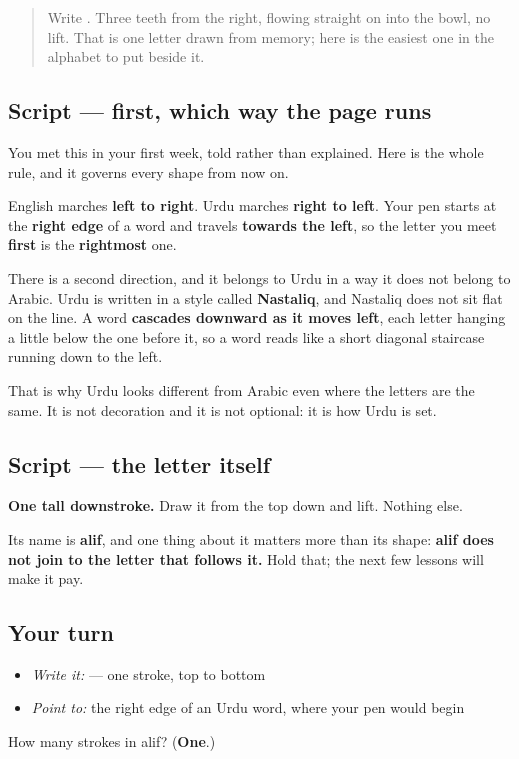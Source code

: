 \label{lesson:UR-W02-alef}



\begin{quote}
Write \textbf{}. Three teeth from the right, flowing straight on into the bowl, no lift. That is one letter drawn from memory; here is the easiest one in the alphabet to put beside it.
\end{quote}

\subsection*{Script — first, which way the page runs}

You met this in your first week, told rather than explained. Here is the whole rule, and it governs every shape from now on.

English marches \textbf{left to right}. Urdu marches \textbf{right to left}. Your pen starts at the \textbf{right edge} of a word and travels \textbf{towards the left}, so the letter you meet \textbf{first} is the \textbf{rightmost} one.

There is a second direction, and it belongs to Urdu in a way it does not belong to Arabic. Urdu is written in a style called \textbf{Nastaliq}, and Nastaliq does not sit flat on the line. A word \textbf{cascades downward as it moves left}, each letter hanging a little below the one before it, so a word reads like a short diagonal staircase running down to the left.

That is why Urdu looks different from Arabic even where the letters are the same. It is not decoration and it is not optional: it is how Urdu is set.

\subsection*{Script — the letter itself}
\begin{quote}
\end{quote}

\textbf{One tall downstroke.} Draw it from the top down and lift. Nothing else.

Its name is \textbf{alif}, and one thing about it matters more than its shape: \textbf{alif does not join to the letter that follows it.} Hold that; the next few lessons will make it pay.

\subsection*{Your turn}
\begin{itemize}
\raggedright
  \item \emph{Write it:}  — one stroke, top to bottom
  \item \emph{Point to:} the right edge of an Urdu word, where your pen would begin
\end{itemize}

\begin{tcolorbox}[breakable,colback=teal!4,colframe=teal!35!black,title={Before you move on}]
How many strokes in alif? (\textbf{One}.)
\end{tcolorbox}
